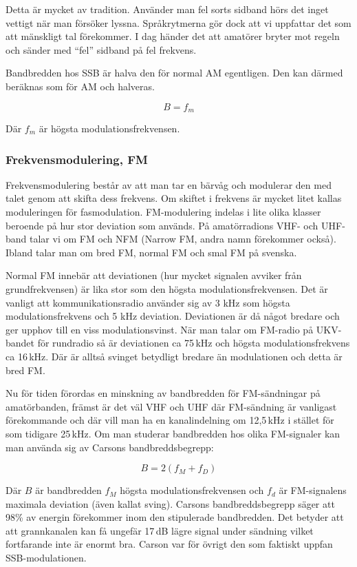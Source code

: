 Detta är mycket av tradition. Använder man fel sorts sidband hörs det inget vettigt när man försöker lyssna. Språkrytmerna gör dock att vi uppfattar det som att mänskligt tal förekommer. I dag händer det att amatörer bryter mot regeln och sänder med ``fel'' sidband på fel frekvens.

Bandbredden hos SSB är halva den för normal AM egentligen. Den kan därmed beräknas som för AM och halveras.

$$B=f_m$$

Där $f_m$ är högsta modulationsfrekvensen.

\subsubsection{Frekvensmodulering, FM}

Frekvensmodulering består av att man tar en bärvåg och modulerar den med talet genom att skifta dess frekvens. Om skiftet i frekvens är mycket litet kallas moduleringen för fasmodulation. FM-modulering indelas i lite olika klasser beroende på hur stor deviation som används. På amatörradions VHF- och UHF-band talar vi om FM och NFM (Narrow FM, andra namn förekommer också). Ibland talar man om bred FM, normal FM och smal FM på svenska.

Normal FM innebär att deviationen (hur mycket signalen avviker från grundfrekvensen) är lika stor som den högsta modulationsfrekvensen. Det är vanligt att kommunikationsradio använder sig av 3 kHz som högsta modulationsfrekvens och 5 kHz deviation. Deviationen är då något bredare och ger upphov till en viss modulationsvinst. När man talar om FM-radio på UKV-bandet för rundradio så är deviationen ca 75\,kHz och högsta modulationsfrekvens ca 16\,kHz. Där är alltså svinget betydligt bredare än modulationen och detta är bred FM.

Nu för tiden förordas en minskning av bandbredden för FM-sändningar på amatörbanden, främst är det väl VHF och UHF där FM-sändning är vanligast förekommande och där vill man ha en kanalindelning om 12,5\,kHz i stället för som tidigare 25\,kHz. Om man studerar bandbredden hos olika FM-signaler kan man använda sig av Carsons bandbreddsbegrepp:

$$B=2(f_M+f_D)$$

Där $B$ är bandbredden $f_M$ högsta modulationsfrekvensen och $f_d$ är FM-signalens maximala deviation (även kallat sving). Carsons bandbreddsbegrepp säger att 98\% av energin förekommer inom den stipulerade bandbredden. Det betyder att att grannkanalen kan få ungefär 17\,dB lägre signal under sändning vilket fortfarande inte är enormt bra. Carson var för övrigt den som faktiskt uppfan SSB-modulationen.

